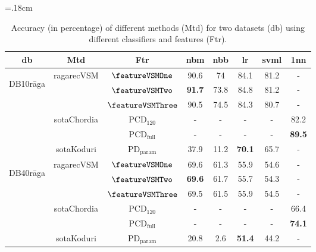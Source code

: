 
\begin{table}
	\tabcolsep=.18cm
	\centering
	\begin{tabular}{c|c|c|c c c c c}
		\hline
		db & Mtd & Ftr & \acrshort{nbm} & \acrshort{nbb} & \acrshort{lr} & \acrshort{svml} & \acrshort{1nn}\tabularnewline
		\hline \hline 
		\multirow{5}{*}{\begin{turn}{90}DB10r\={a}ga\end{turn}} & \multirow{3}{*}{\acrshort{ragarecVSM}} & $\featureVSMOne$ & 90.6 & 74 & 84.1 & 81.2 & -\tabularnewline
		
		&  & $\featureVSMTwo$ & {\bf 91.7} & 73.8 & 84.8 & 81.2 & -\tabularnewline
		
		&  & $\featureVSMThree$ & 90.5 & 74.5 & 84.3 & 80.7 & -\tabularnewline
		\cline{2-8} 
		& \multirow{2}{*}{\acrshort{sotaChordia}} & $\mathrm{PCD}_{120}$ & - & - & - & - & 82.2\tabularnewline
		& & $\mathrm{PCD}_\mathrm{full}$ & - & - & - & - & {\bf 89.5}\tabularnewline
		\cline{2-8} 
		& \acrshort{sotaKoduri} & $\mathrm{PD}_\mathrm{param}$ & 37.9 & 11.2 & {\bf 70.1} & 65.7 & -\tabularnewline
		\hline \hline
		\multirow{5}{*}{\begin{turn}{90}DB40r\={a}ga\end{turn}} & \multirow{3}{*}{\acrshort{ragarecVSM}} & $\featureVSMOne$ & 69.6 & 61.3 & 55.9 & 54.6 & -\tabularnewline
		
		&  & $\featureVSMTwo$ & {\bf 69.6} & 61.7 & 55.7 & 54.3 & -\tabularnewline
		
		&  & $\featureVSMThree$ & 69.5 & 61.5 & 55.9 & 54.5 & -\tabularnewline
		\cline{2-8} 
		& \multirow{2}{*}{\acrshort{sotaChordia}} & $\mathrm{PCD}_{120}$ & - & - & - & - & 66.4\tabularnewline
		
		& & $\mathrm{PCD}_\mathrm{full}$ & - & - & - & - & {\bf 74.1}\tabularnewline
		\cline{2-8} 
		& \acrshort{sotaKoduri} & $\mathrm{PD}_\mathrm{param}$ & 20.8 & 2.6 & {\bf 51.4} & 44.2 & -\tabularnewline
		\hline \hline
	\end{tabular}
	
	\caption{Accuracy (in percentage) of different methods (Mtd) for two datasets (db) using different classifiers and features (Ftr).} 
	\label{tab:accuracies_for_variants}
\end{table}



